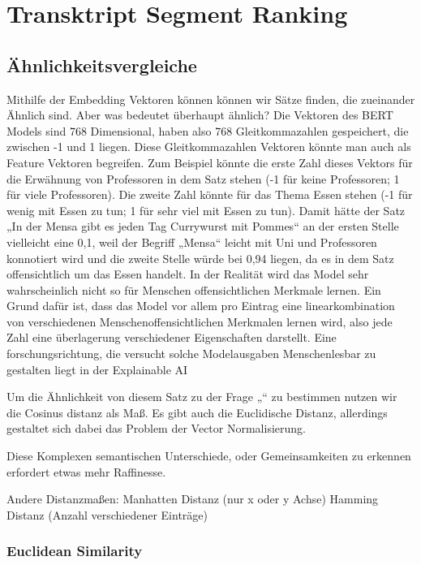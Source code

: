 \section{Transktript Segment Ranking}


\subsection{Ähnlichkeitsvergleiche}

Mithilfe der Embedding Vektoren können können wir Sätze finden, die zueinander Ähnlich sind. Aber was bedeutet überhaupt ähnlich? Die Vektoren des BERT Models sind 768 Dimensional, haben also 768 Gleitkommazahlen gespeichert, die zwischen -1 und 1 liegen. 
Diese Gleitkommazahlen Vektoren könnte man auch als Feature Vektoren begreifen. 
Zum Beispiel könnte die erste Zahl dieses Vektors für die Erwähnung von Professoren in dem Satz stehen (-1 für keine Professoren; 1 für viele Professoren). 
Die zweite Zahl könnte für das Thema Essen stehen (-1 für wenig mit Essen zu tun; 1 für sehr viel mit Essen zu tun). 
Damit hätte der Satz „In der Mensa gibt es jeden Tag Currywurst mit Pommes“ an der ersten Stelle vielleicht eine 0,1, weil der Begriff „Mensa“ leicht mit Uni und Professoren konnotiert wird und die zweite Stelle würde bei 0,94 liegen, da es in dem Satz offensichtlich um das Essen handelt. 
In der Realität wird das Model sehr wahrscheinlich nicht so für Menschen offensichtlichen Merkmale lernen. Ein Grund dafür ist, dass das Model vor allem pro Eintrag eine linearkombination von verschiedenen Menschenoffensichtlichen Merkmalen lernen wird, also jede Zahl eine überlagerung verschiedener Eigenschaften darstellt. 
Eine forschungsrichtung, die versucht solche Modelausgaben Menschenlesbar zu gestalten liegt in der Explainable AI

Um die Ähnlichkeit von diesem Satz zu der Frage „“ zu bestimmen nutzen wir die Cosinus distanz als Maß. Es gibt auch die Euclidische Distanz, allerdings gestaltet sich dabei das Problem der Vector Normalisierung.


Diese Komplexen semantischen Unterschiede, oder Gemeinsamkeiten zu erkennen erfordert etwas mehr Raffinesse.

Andere Distanzmaßen:
Manhatten Distanz (nur x oder y Achse)
Hamming Distanz (Anzahl verschiedener Einträge)

\subsubsection{Euclidean Similarity}

